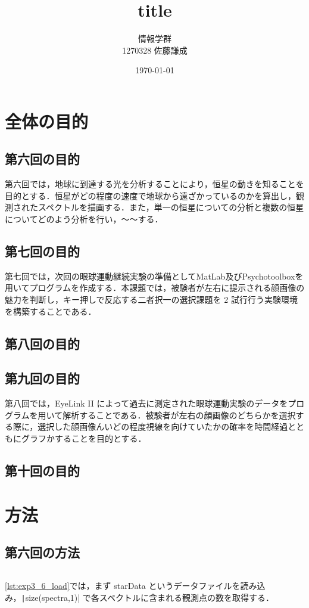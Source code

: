 \documentclass[dvipdfmx, titlepage, t]{jsarticle}
\title{title}
\author{情報学群 \\ 1270328 佐藤謙成}
\date{\today}
\begin{document}
\maketitle

\begin{abstract}
    
\end{abstract}
\section{全体の目的}
\subsection{第六回の目的}
    第六回では，地球に到達する光を分析することにより，恒星の動きを知ることを目的とする．恒星がどの程度の速度で地球から遠ざかっているのかを算出し，観測されたスペクトルを描画する．また，単一の恒星についての分析と複数の恒星についてどのよう分析を行い，～～する．
\subsection{第七回の目的}
    第七回では，次回の眼球運動継続実験の準備としてMatLab及びPsychotoolboxを用いてプログラムを作成する．本課題では，被験者が左右に提示される顔画像の魅力を判断し，キー押しで反応する二者択一の選択課題を 2 試行行う実験環境を構築することである．
\subsection{第八回の目的}
\subsection{第九回の目的}
    第八回では，EyeLink II によって過去に測定された眼球運動実験のデータをプログラムを用いて解析することである．被験者が左右の顔画像のどちらかを選択する際に，選択した顔画像んいどの程度視線を向けていたかの確率を時間経過とともにグラフかすることを目的とする．
\subsection{第十回の目的}
\section{方法}
\subsection{第六回の方法}
    \inputminted[linenos, firstline=1, lastline=2, frame=lines, fontsize=\small]{matlab}{code/Exp3_6_Matlab.m}
    \ref{lst:exp3_6_load}では，まず starData というデータファイルを読み込み，\texttt|size(spectra,1)| で各スペクトルに含まれる観測点の数を取得する．
\end{document}
